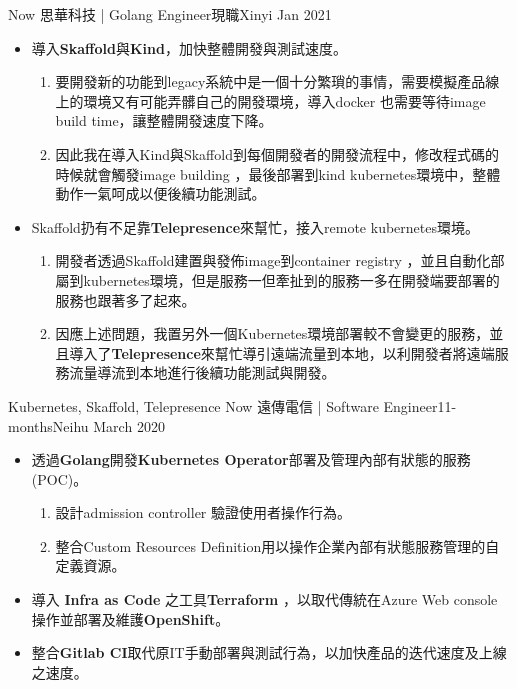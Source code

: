 \begin{experiences}
	\experience
	{Now}   {思華科技 | Golang Engineer}{現職}{Xinyi}
	{Jan 2021} {
		\begin{itemize}
			\item 導入\textbf{Skaffold}與\textbf{Kind}，加快整體開發與測試速度。
			\begin{enumerate}                      	
				\item 要開發新的功能到legacy系統中是一個十分繁瑣的事情，需要模擬產品線上的環境又有可能弄髒自己的開發環境，導入docker 也需要等待image build time，讓整體開發速度下降。
				\item 因此我在導入Kind與Skaffold到每個開發者的開發流程中，修改程式碼的時候就會觸發image building ，最後部署到kind  kubernetes環境中，整體動作一氣呵成以便後續功能測試。
			\end{enumerate}
			\item Skaffold扔有不足靠\textbf{Telepresence}來幫忙，接入remote kubernetes環境。
			\begin{enumerate}
				\item 開發者透過Skaffold建置與發佈image到container registry ，並且自動化部屬到kubernetes環境，但是服務一但牽扯到的服務一多在開發端要部署的服務也跟著多了起來。
				\item 因應上述問題，我置另外一個Kubernetes環境部署較不會變更的服務，並且導入了\textbf{Telepresence}來幫忙導引遠端流量到本地，以利開發者將遠端服務流量導流到本地進行後續功能測試與開發。
			\end{enumerate}
		\end{itemize}
	}
	{Kubernetes, Skaffold, Telepresence}
	\emptySeparator
  \experience
    {Now}   {遠傳電信 | Software Engineer}{11-months}{Neihu}
    {March 2020} {
                      \begin{itemize}
                        \item 透過\textbf{Golang}開發\textbf{Kubernetes Operator}部署及管理內部有狀態的服務 (POC)。
                        \begin{enumerate}
                        	\item 設計admission controller 驗證使用者操作行為。
                            \item 整合Custom Resources Definition用以操作企業內部有狀態服務管理的自定義資源。
                        \end{enumerate}
                        \item 導入 \textbf{Infra as Code} 之工具\textbf{Terraform} ，以取代傳統在Azure Web console 操作並部署及維護\textbf{OpenShift}。           
                        \item 整合\textbf{Gitlab CI}取代原IT手動部署與測試行為，以加快產品的迭代速度及上線之速度。                

\end{itemize}}
\end{experiences}
